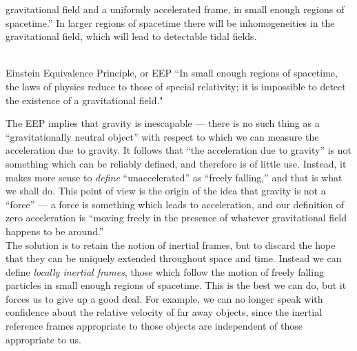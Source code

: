 gravitational field and a uniformly accelerated frame, in small enough regions of spacetime.”
In larger regions of spacetime there will be inhomogeneities in the gravitational field, which will lead to detectable tidal fields.
\\
\\
\begin{mybox}{Einstein Equivalence
	Principle, or EEP}
“In small enough regions of spacetime, the laws of physics reduce to
those of special relativity; it is impossible to detect the existence of a gravitational field."
\end{mybox}
The EEP implies that gravity is inescapable — there is no such thing as a “gravitationally neutral
object” with respect to which we can measure the acceleration due to gravity. It follows
that “the acceleration due to gravity” is not something which can be reliably defined, and
therefore is of little use.
Instead, it makes more sense to \emph{define} “unaccelerated” as “freely falling,” and that is
what we shall do. This point of view is the origin of the idea that gravity is not a “force”
— a force is something which leads to acceleration, and our definition of zero acceleration is
“moving freely in the presence of whatever gravitational field happens to be around.”\\
The solution is to retain the notion of inertial frames, but to discard the hope that they
can be uniquely extended throughout space and time. Instead we can define \emph{locally inertial
	frames}, those which follow the motion of freely falling particles in small enough regions of
spacetime. This is the best we
can do, but it forces us to give up a good deal. For example, we can no longer speak with
confidence about the relative velocity of far away objects, since the inertial reference frames
appropriate to those objects are independent of those appropriate to us.

